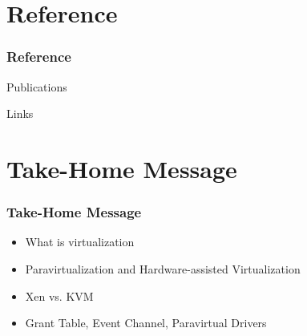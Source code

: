 \documentclass[aspectratio=169]{beamer}
\begin{document}

\section {Reference}
\begin{frame}
\frametitle{Reference}
\begin{block}{Publications}
\end{block}
\begin{block}{Links}
\end{block}
\end{frame}


\section{Take-Home Message}
\begin{frame}
\frametitle{Take-Home Message}
\begin{itemize}
\item What is virtualization
\item Paravirtualization and Hardware-assisted Virtualization
\item Xen vs. KVM
\item Grant Table, Event Channel, Paravirtual Drivers
\end{itemize}
\end{frame}


\end{document}
